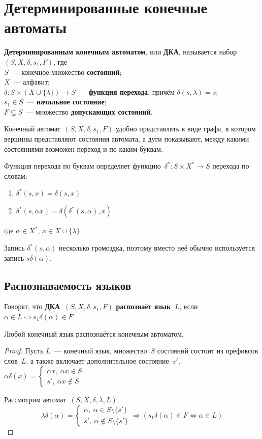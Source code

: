 \section{Детерминированные конечные автоматы}
  \textbf{Детерминированным конечным автоматом}, или \textbf{ДКА}, называется набор~$(S, X, \delta, s_1, F)$, где\\
$S$~--- конечное множество \textbf{состояний};\\
$X$~--- алфавит;\\
$\delta \colon S \times (X \cup \{ \lambda \}) \to S$~--- \textbf{функция перехода}, причём $\delta(s, \lambda) = s$;\\
$s_1 \in S$~--- \textbf{начальное состояние};\\
$F \subseteq S$~--- множество \textbf{допускающих состояний}.

Конечный автомат~$(S, X, \delta, s_1, F)$ удобно представлять в виде графа, в котором вершины представляют состояния автомата, а дуги показывают, между какими состояниями возможен переход и по каким буквам.

Функция перехода по буквам определяет функцию~$\delta^* \colon S \times X^* \to S$ перехода по словам:
\begin{enumerate}
	\item $\delta^*(s, x) = \delta(s, x)$
	\item $\delta^*(s, \alpha x) = \delta(\delta^*(s, \alpha), x)$
\end{enumerate}
где $\alpha \in X^*$, $x \in X \cup \{ \lambda \}$.

Запись $\delta^*(s, \alpha)$ несколько громоздка, поэтому вместо неё обычно используется запись $s \delta(\alpha)$.

\subsection{Распознаваемость языков}
Говорят, что \textbf{ДКА~$(S, X, \delta, s_1, F)$ распознаёт язык~$L$}, если $\alpha \in L \Leftrightarrow s_1 \delta(\alpha) \in F$.

\begin{statement}
Любой конечный язык распознаётся конечным автоматом.
\end{statement}
\begin{proof}
Пусть $L$~--- конечный язык, множество~$S$ состояний состоит из префиксов слов~$L$, а также включает дополнительное состояние~$s'$, $\alpha \delta(x) =
\begin{cases}
\alpha x, \ \alpha x \in S \\
s', \ \alpha x \notin S
\end{cases}$

Рассмотрим автомат~$(S, X, \delta, \lambda, L)$.
\begin{equation*}
\lambda \delta(\alpha) =
\begin{cases}
\alpha, \ \alpha \in S \setminus \{ s' \} \\
s', \ \alpha \notin S \setminus \{ s' \}
\end{cases} \Rightarrow
(s_1 \delta(\alpha) \in F \Leftrightarrow \alpha \in L)
\end{equation*}
\end{proof}

